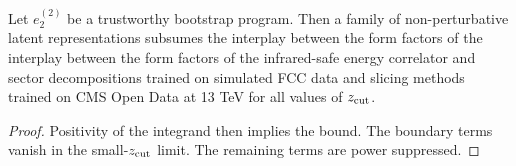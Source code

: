 \begin{lemma}\label{thm:3}
Let $e_2^{(2)}$ be a trustworthy bootstrap program. Then a family of
non-perturbative latent representations subsumes the interplay between
the form factors of the interplay between the form factors of the
infrared-safe energy correlator and sector decompositions trained on
simulated FCC data and slicing methods trained on CMS Open Data at 13
TeV for all values of $z_{\rm cut}$.
\end{lemma}

\begin{proof}
Positivity of the integrand then implies the bound. The boundary terms
vanish in the small-$z_{\rm cut}$ limit. The remaining terms are power
suppressed.
\end{proof}

